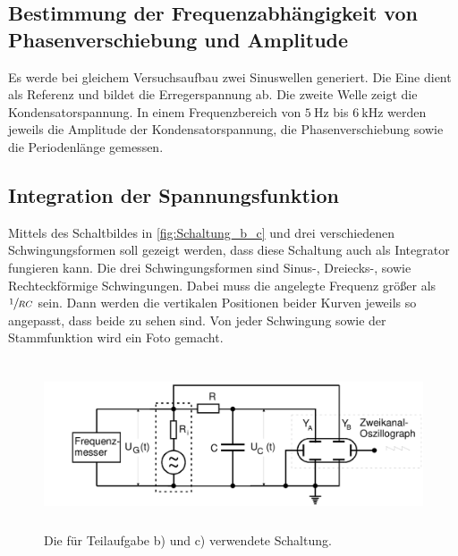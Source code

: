 \subsection{Bestimmung der Frequenzabhängigkeit von Phasenverschiebung und Amplitude}
Es werde bei gleichem Versuchsaufbau zwei Sinuswellen generiert.
Die Eine dient als Referenz und bildet die Erregerspannung ab.
Die zweite Welle zeigt die Kondensatorspannung.
In einem Frequenzbereich von $\qty{5}{\hertz}$ bis $\qty{6}{\kilo\hertz}$ werden jeweils
die Amplitude der Kondensatorspannung, die Phasenverschiebung sowie die Periodenlänge
gemessen.
\subsection{Integration der Spannungsfunktion}
Mittels des Schaltbildes in \autoref{fig:Schaltung_b_c} und drei verschiedenen
Schwingungsformen soll gezeigt werden, dass diese Schaltung auch als Integrator fungieren 
kann. Die drei Schwingungsformen sind Sinus-, Dreiecks-, sowie Rechteckförmige Schwingungen.
Dabei muss die angelegte Frequenz größer als $\sfrac{1}{RC}$ sein. Dann werden die vertikalen 
Positionen beider Kurven jeweils so angepasst, dass beide zu sehen sind. Von jeder Schwingung 
sowie der Stammfunktion wird ein Foto gemacht.
\begin{figure}
    \centering
    \includegraphics[height=5cm]{messdaten/Schaltung_b_c.png}
    \caption{Die für Teilaufgabe b) und c) verwendete Schaltung.}
    \label{fig:Schaltung_b_c}
\end{figure}